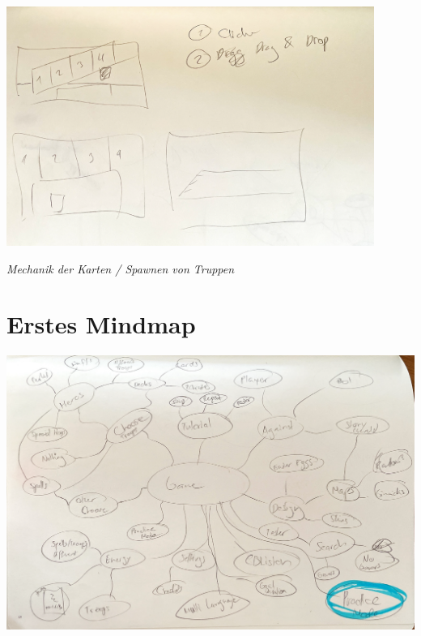 \begin{center}
    \includegraphics*[width=12cm]{resources/sk_dragndrop.png}
\end{center}
\qquad \quad \enspace \textit{Mechanik der Karten / Spawnen von Truppen}


\section{Erstes Mindmap}
\begin{center}
    \includegraphics*[width=14.5cm]{resources/sk_mindmap1.png}
\end{center}



